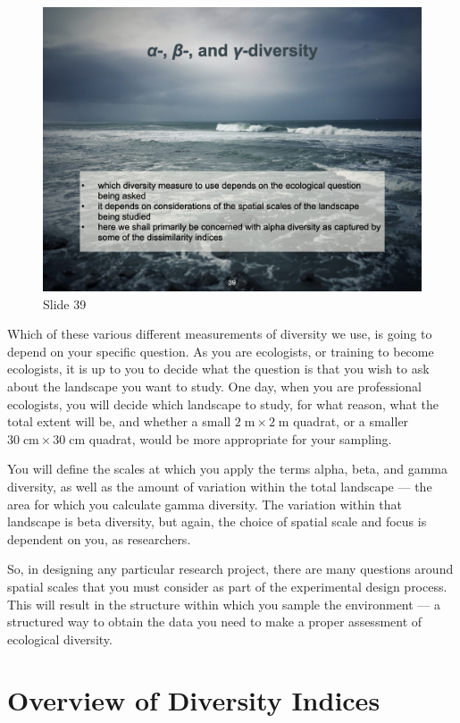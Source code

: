 \documentclass[
  12pt,
]{book}
\begin{document}
\begin{figure}[ht]
\centering
\includegraphics[width=0.8\linewidth]{../images/BDC334/BDC334-039.jpeg}
\caption*{Slide 39}
\end{figure}

Which of these various different measurements of diversity we use, is
going to depend on your specific question. As you are ecologists, or
training to become ecologists, it is up to you to decide what the
question is that you wish to ask about the landscape you want to study.
One day, when you are professional ecologists, you will decide which
landscape to study, for what reason, what the total extent will be, and
whether a small \(2\;\mathrm{m} \times 2\;\mathrm{m}\) quadrat, or a
smaller \(30\;\mathrm{cm} \times 30\;\mathrm{cm}\) quadrat, would be
more appropriate for your sampling.

You will define the scales at which you apply the terms alpha, beta, and
gamma diversity, as well as the amount of variation within the total
landscape --- the area for which you calculate gamma diversity. The
variation within that landscape is beta diversity, but again, the choice
of spatial scale and focus is dependent on you, as researchers.

So, in designing any particular research project, there are many
questions around spatial scales that you must consider as part of the
experimental design process. This will result in the structure within
which you sample the environment --- a structured way to obtain the data
you need to make a proper assessment of ecological diversity.

\section{Overview of Diversity
Indices}\label{overview-of-diversity-indices}
\end{document}

